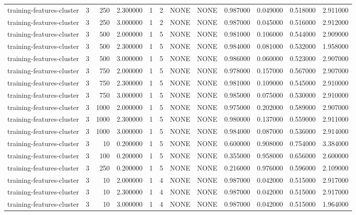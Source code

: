 \begin{tabular}{lrrrllllrrrr}
training-features-cluster & 3 & 250 & 2.300000 & 1 & 2 & NONE & NONE & 0.987000 & 0.049000 & 0.518000 & 2.911000 \\
training-features-cluster & 3 & 250 & 3.000000 & 1 & 2 & NONE & NONE & 0.987000 & 0.045000 & 0.516000 & 2.912000 \\
training-features-cluster & 3 & 500 & 2.000000 & 1 & 5 & NONE & NONE & 0.981000 & 0.106000 & 0.544000 & 2.909000 \\
training-features-cluster & 3 & 500 & 2.300000 & 1 & 5 & NONE & NONE & 0.984000 & 0.081000 & 0.532000 & 1.958000 \\
training-features-cluster & 3 & 500 & 3.000000 & 1 & 5 & NONE & NONE & 0.986000 & 0.060000 & 0.523000 & 2.907000 \\
training-features-cluster & 3 & 750 & 2.000000 & 1 & 5 & NONE & NONE & 0.978000 & 0.157000 & 0.567000 & 2.907000 \\
training-features-cluster & 3 & 750 & 2.300000 & 1 & 5 & NONE & NONE & 0.981000 & 0.109000 & 0.545000 & 2.910000 \\
training-features-cluster & 3 & 750 & 3.000000 & 1 & 5 & NONE & NONE & 0.985000 & 0.075000 & 0.530000 & 2.910000 \\
training-features-cluster & 3 & 1000 & 2.000000 & 1 & 5 & NONE & NONE & 0.975000 & 0.202000 & 0.589000 & 2.907000 \\
training-features-cluster & 3 & 1000 & 2.300000 & 1 & 5 & NONE & NONE & 0.980000 & 0.137000 & 0.559000 & 2.911000 \\
training-features-cluster & 3 & 1000 & 3.000000 & 1 & 5 & NONE & NONE & 0.984000 & 0.087000 & 0.536000 & 2.914000 \\
training-features-cluster & 3 & 10 & 0.200000 & 1 & 5 & NONE & NONE & 0.600000 & 0.908000 & 0.754000 & 3.384000 \\
training-features-cluster & 3 & 100 & 0.200000 & 1 & 5 & NONE & NONE & 0.355000 & 0.958000 & 0.656000 & 2.600000 \\
training-features-cluster & 3 & 250 & 0.200000 & 1 & 5 & NONE & NONE & 0.216000 & 0.976000 & 0.596000 & 2.109000 \\
training-features-cluster & 3 & 10 & 2.000000 & 1 & 4 & NONE & NONE & 0.987000 & 0.042000 & 0.515000 & 2.917000 \\
training-features-cluster & 3 & 10 & 2.300000 & 1 & 4 & NONE & NONE & 0.987000 & 0.042000 & 0.515000 & 2.917000 \\
training-features-cluster & 3 & 10 & 3.000000 & 1 & 4 & NONE & NONE & 0.987000 & 0.042000 & 0.515000 & 1.964000 \\

\end{tabular}
